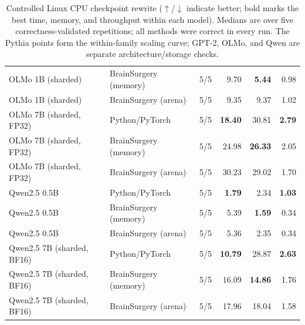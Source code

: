 \begin{table}[t]
\begin{tabular}{lllrrr}
OLMo 1B (sharded) & BrainSurgery (memory) & 5/5 & 9.70 & \textbf{5.44} & 0.98 \\
OLMo 1B (sharded) & BrainSurgery (arena) & 5/5 & 9.35 & 9.37 & 1.02 \\
OLMo 7B (sharded, FP32) & Python/PyTorch & 5/5 & \textbf{18.40} & 30.81 & \textbf{2.79} \\
OLMo 7B (sharded, FP32) & BrainSurgery (memory) & 5/5 & 24.98 & \textbf{26.33} & 2.05 \\
OLMo 7B (sharded, FP32) & BrainSurgery (arena) & 5/5 & 30.23 & 29.02 & 1.70 \\
Qwen2.5 0.5B & Python/PyTorch & 5/5 & \textbf{1.79} & 2.34 & \textbf{1.03} \\
Qwen2.5 0.5B & BrainSurgery (memory) & 5/5 & 5.39 & \textbf{1.59} & 0.34 \\
Qwen2.5 0.5B & BrainSurgery (arena) & 5/5 & 5.36 & 2.35 & 0.34 \\
Qwen2.5 7B (sharded, BF16) & Python/PyTorch & 5/5 & \textbf{10.79} & 28.87 & \textbf{2.63} \\
Qwen2.5 7B (sharded, BF16) & BrainSurgery (memory) & 5/5 & 16.09 & \textbf{14.86} & 1.76 \\
Qwen2.5 7B (sharded, BF16) & BrainSurgery (arena) & 5/5 & 17.96 & 18.04 & 1.58 \\
\bottomrule
\end{tabular}
\caption{Controlled Linux CPU checkpoint rewrite ($\uparrow$/$\downarrow$ indicate better; bold marks the best time, memory, and throughput within each model). Medians are over five correctness-validated repetitions; all methods were correct in every run. The Pythia points form the within-family scaling curve; GPT-2, OLMo, and Qwen are separate architecture/storage checks.}
\label{tab:checkpoint-scaling}
\end{table}
